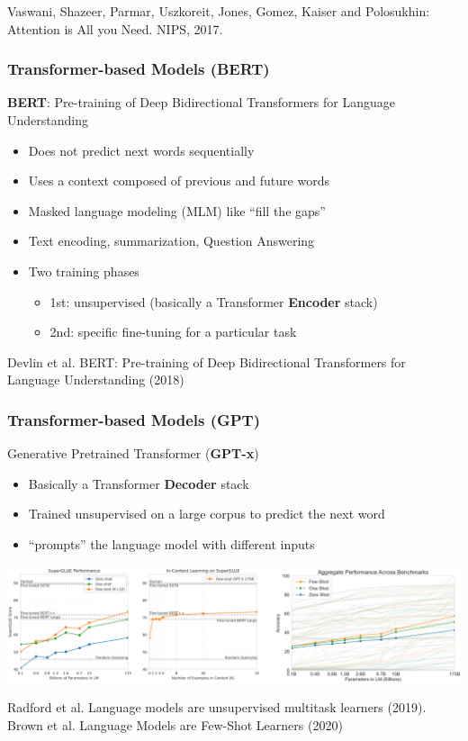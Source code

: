 \documentclass[10pt]{beamer}
\begin{document}
\begin{frame}
\begin{columns}
\begin{center}
\end{center}
    \end{columns}
\vspace{.25cm}
\scriptsize{Vaswani, Shazeer, Parmar, Uszkoreit, Jones, Gomez, Kaiser and Polosukhin: Attention is All you Need. NIPS, 2017.}
\end{frame}

\begin{frame}
  \frametitle{Transformer-based Models (BERT)}
{\color{red}\textbf{BERT}: Pre-training of Deep Bidirectional Transformers for Language Understanding}

\begin{itemize}
\setlength\itemsep{.6em}
\item Does not predict next words sequentially
\item Uses a context composed of previous and future words
\item Masked language modeling (MLM) like ``fill the gaps''
\item Text encoding, summarization, Question Answering
\item Two training phases
\begin{itemize}
\item 1st: unsupervised (basically a Transformer \textbf{Encoder} stack)
\item 2nd: specific fine-tuning for a particular task
\end{itemize} 
\end{itemize} 
\vspace{.5cm}
\scriptsize{Devlin et al. BERT: Pre-training of Deep Bidirectional Transformers for Language Understanding (2018)}
\end{frame}

\begin{frame}
  \frametitle{Transformer-based Models (GPT)}
{\color{red}Generative Pretrained Transformer (\textbf{GPT-x})}

\begin{itemize}
\setlength\itemsep{.3em}
\item Basically a Transformer \textbf{Decoder} stack
\item Trained unsupervised on a large corpus to predict the next word
\item ``prompts'' the language model with different inputs
\end{itemize}
	\includegraphics[width=1.05\columnwidth]{images/gptc}
\vspace{.05cm}

\scriptsize{Radford et al. Language models are unsupervised multitask learners (2019).\\
Brown et al. Language Models are Few-Shot Learners (2020)}
\end{frame}
\end{document}
